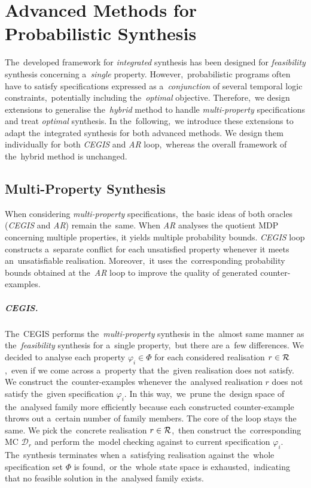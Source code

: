 \chapter{Advanced Methods for Probabilistic Synthesis}\label{chap:advanced}
The~developed framework for \textit{integrated} synthesis has been designed for \textit{feasibility} synthesis concerning a~\textit{single} property.
However,~probabilistic programs often have to satisfy specifications expressed as a~\textit{conjunction} of several temporal logic constraints,~potentially including the~\textit{optimal} objective.
Therefore,~we design extensions to generalise the~\textit{hybrid} method to handle \textit{multi-property} specifications and treat \textit{optimal} synthesis.
In the~following,~we introduce these extensions to adapt the~integrated synthesis for both advanced methods. 
We design them individually for both \emph{CEGIS} and \emph{AR} loop,~whereas the overall framework of the~hybrid method is unchanged.

\section{Multi-Property Synthesis}
When considering \textit{multi-property} specifications,~the basic ideas of both oracles (\textit{CEGIS} and \textit{AR}) remain the~same.
When \textit{AR} analyses the quotient MDP concerning multiple properties, it yields multiple probability bounds.
\textit{CEGIS} loop constructs a~separate conflict for each unsatisfied property whenever it meets an~unsatisfiable realisation.
Moreover,~it uses the~corresponding probability bounds obtained at the~\textit{AR} loop to improve the quality of generated counter-examples.

\paragraph{CEGIS.}
The~CEGIS performs the~\textit{multi-property} synthesis in the~almost same manner as the~\textit{feasibility} synthesis for a~single property,~but there are a~few differences.
We decided to analyse each property $\varphi_i \in \varPhi$ for each considered realisation $r \in \mathcal{R}$,~even if we come across a~property that the~given realisation does not satisfy.
We construct the~counter-examples whenever the~analysed realisation $r$ does not satisfy the~given specification $\varphi_{i}$.
In this way,~we~prune the~design space of the~analysed family more efficiently because each constructed counter-example throws out a~certain number of family members.
The core of the loop stays the same.
We pick the~concrete realisation $r \in \mathcal{R}$,~then construct the~corresponding MC $\mathcal{D}_r$ and perform the~model checking against to current specification $\varphi_i$.
The~synthesis terminates when a~satisfying realisation against the~whole specification set $\varPhi$ is found,~or the~whole state space is exhausted,~indicating that no feasible solution in the~analysed family exists.


